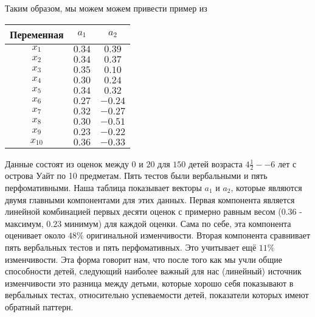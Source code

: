 \renewcommand{\thesubsubsection}{Пример}
\subsubsection{}
Таким образом, мы можем можем привести пример из \cite{pca}

\begin{center}
\begin{tabular}{ |c|c|c| } 
 \hline
 Переменная & $a_1$ & $a_2$ \\ 
 \hline \hline
 $x_1$ & $0.34$ & $0.39$ \\ 
 \hline
 $x_2$ & $0.34$ & $0.37$ \\ 
 \hline
 $x_3$ & $0.35$ & $0.10$ \\ 
 \hline
 $x_4$ & $0.30$ & $0.24$ \\ 
 \hline
 $x_5$ & $0.34$ & $0.32$ \\ 
 \hline
 $x_6$ & $0.27$ & $-0.24$ \\ 
 \hline
 $x_7$ & $0.32$ & $-0.27$ \\ 
 \hline
 $x_8$ & $0.30$ & $-0.51$ \\ 
 \hline
 $x_9$ & $0.23$ & $-0.22$ \\ 
 \hline
 $x_10$ & $0.36$ & $-0.33$ \\ 
 \hline
\end{tabular}
\end{center}

Данные состоят из оценок между $0$ и $20$ для $150$ детей возраста $4 \frac{1}{2} -- 6$ лет с острова Уайт по 10 предметам. 
Пять тестов были вербальными и пять перфомативными. Наша таблица показывает векторы $a_1$ и $a_2$, которые являются двумя главными компонентами для этих данных. 
Первая компонента является линейной комбинацией первых десяти оценок с примерно равным весом ($0.36$ - максимум, $0.23$ минимум) для каждой оценки. 
Сама по себе, эта компонента оценивает около $48\%$ оригинальной изменчивости. Вторая компонента сравнивает пять вербальных тестов и пять перфомативных. 
Это учитывает ещё $11\%$ изменчивости. 
Эта форма говорит нам, что после того как мы учли общие способности детей, следующий наиболее важный для нас (линейный) источник изменчивости это разница между детьми, которые хорошо себя показывают в вербальных тестах, относительно успеваемости детей, показатели которых имеют обратный паттерн.
